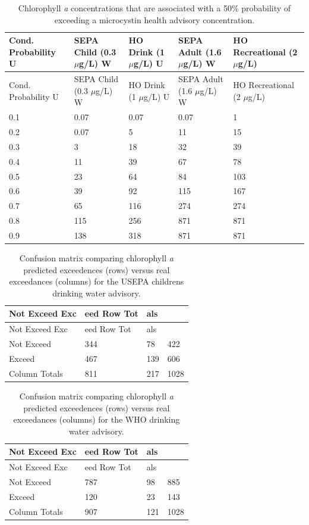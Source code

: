 \documentclass[11pt,]{article}
\begin{document}
\newpage

\begin{longtable}[c]{@{}lllll@{}}
\caption{Chlorophyll \textit{a} concentrations that are associated with
a 50\% probability of exceeding a microcystin health advisory
concentration. \label{tab:mc_chla_table}}\tabularnewline
\toprule
Cond. Probability U & SEPA Child (0.3 \(\mu\)g/L) W & HO Drink (1
\(\mu\)g/L) U & SEPA Adult (1.6 \(\mu\)g/L) W & HO Recreational (2
\(\mu\)g/L)\tabularnewline
\midrule
\endfirsthead
\toprule
Cond. Probability U & SEPA Child (0.3 \(\mu\)g/L) W & HO Drink (1
\(\mu\)g/L) U & SEPA Adult (1.6 \(\mu\)g/L) W & HO Recreational (2
\(\mu\)g/L)\tabularnewline
\midrule
\endhead
0.1 & 0.07 & 0.07 & 0.07 & 1\tabularnewline
0.2 & 0.07 & 5 & 11 & 15\tabularnewline
0.3 & 3 & 18 & 32 & 39\tabularnewline
0.4 & 11 & 39 & 67 & 78\tabularnewline
0.5 & 23 & 64 & 84 & 103\tabularnewline
0.6 & 39 & 92 & 115 & 167\tabularnewline
0.7 & 65 & 116 & 274 & 274\tabularnewline
0.8 & 115 & 256 & 871 & 871\tabularnewline
0.9 & 138 & 318 & 871 & 871\tabularnewline
\bottomrule
\end{longtable}

\newpage

\begin{longtable}[c]{@{}llll@{}}
\caption{Confusion matrix comparing chlorophyll \textit{a} predicted
exceedences (rows) versus real exceedances (columns) for the USEPA
childrens drinking water advisory.
\label{tab:child_conmat_table}}\tabularnewline
\toprule
Not Exceed Exc & eed Row Tot & als &\tabularnewline
\midrule
\endfirsthead
\toprule
Not Exceed Exc & eed Row Tot & als &\tabularnewline
\midrule
\endhead
Not Exceed & 344 & 78 & 422\tabularnewline
Exceed & 467 & 139 & 606\tabularnewline
Column Totals & 811 & 217 & 1028\tabularnewline
\bottomrule
\end{longtable}

\newpage

\begin{longtable}[c]{@{}llll@{}}
\caption{Confusion matrix comparing chlorophyll \textit{a} predicted
exceedences (rows) versus real exceedances (columns) for the WHO
drinking water advisory.
\label{tab:who_drink_conmat_table}}\tabularnewline
\toprule
Not Exceed Exc & eed Row Tot & als &\tabularnewline
\midrule
\endfirsthead
\toprule
Not Exceed Exc & eed Row Tot & als &\tabularnewline
\midrule
\endhead
Not Exceed & 787 & 98 & 885\tabularnewline
Exceed & 120 & 23 & 143\tabularnewline
Column Totals & 907 & 121 & 1028\tabularnewline
\bottomrule
\end{longtable}
\end{document}
